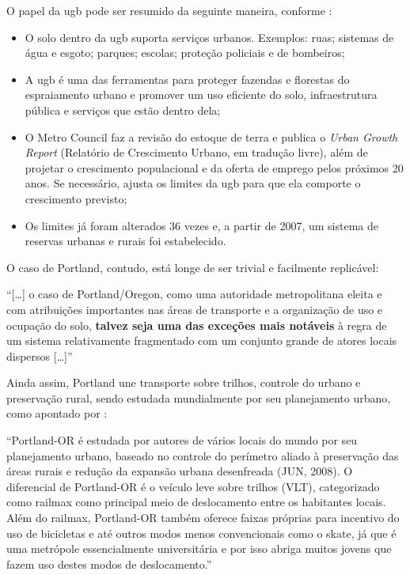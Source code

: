 	O papel da \gls{ugb} pode ser resumido da seguinte maneira, conforme \cite{metro2019a}:

	\begin{itemize}
		\item O solo dentro da \gls{ugb} suporta serviços urbanos. Exemplos: ruas; sistemas de água e esgoto; parques; escolas; proteção policiais e de bombeiros;
		\item A \gls{ugb} é uma das ferramentas para proteger fazendas e florestas do espraiamento urbano e promover um uso eficiente do solo, infraestrutura pública e serviços que estão dentro dela;
		\item O Metro Council faz a revisão do estoque de terra e publica o \textit{Urban Growth Report} (Relatório de Crescimento Urbano, em tradução livre), além de projetar o crescimento populacional e da oferta de emprego pelos próximos 20 anos. Se necessário, ajusta os limites da \gls{ugb} para que ela comporte o crescimento previsto;
		\item Os limites já foram alterados 36 vezes e, a partir de 2007, um sistema de reservas urbanas e rurais foi estabelecido.
	\end{itemize}
	
	O caso de Portland, contudo, está longe de ser trivial e facilmente replicável:
	
	\begin{citacao}
		``[\dots] o caso de Portland/Oregon, como uma autoridade metropolitana eleita e com atribuições importantes nas áreas de transporte e a organização de uso e ocupação do solo, \textbf{talvez seja uma das exceções mais notáveis} à regra de um sistema relativamente fragmentado com um conjunto grande de atores locais dispersos [\dots]'' \cite[p. 224]{klink2009a}
	\end{citacao}

	Ainda assim, Portland une transporte sobre trilhos, controle do urbano e preservação rural, sendo estudada mundialmente por seu planejamento urbano, como apontado por :
	
	\begin{citacao}
		``Portland-OR é estudada por autores de vários locais do mundo por seu planejamento urbano, baseado no controle do perímetro aliado à preservação das áreas rurais e redução da expansão urbana desenfreada (JUN, 2008). O diferencial de Portland-OR é o veículo leve sobre trilhos (VLT), categorizado como railmax como principal meio de deslocamento entre os habitantes locais. Além do railmax, Portland-OR também oferece faixas próprias para incentivo do uso de bicicletas e até outros modos menos convencionais como o skate, já que é uma metrópole essencialmente universitária e por isso abriga muitos jovens que fazem uso destes modos de deslocamento.'' \cite[p. 17]{noronha2015a}
	\end{citacao}
	

